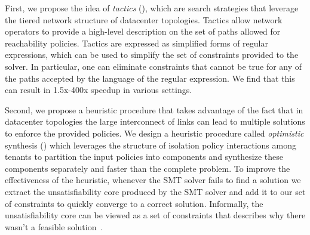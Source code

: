 First, we propose the idea of \emph{tactics} (),
which are search strategies that leverage the tiered network structure
of datacenter topologies.
Tactics allow network operators to provide a high-level description on
the set of paths allowed for reachability policies.  Tactics are
expressed as simplified forms of regular expressions, which can be
used to simplify the set of constraints provided to the solver.  In
particular, one can eliminate constraints that cannot be true for any
of the paths accepted by the language of the regular expression. We
find that this can result in 1.5x-400x speedup in various settings.

Second, we propose a heuristic procedure that takes advantage of the fact that in 
datacenter topologies the large
interconnect of links can lead to multiple solutions 
to enforce the provided policies.  
We design a heuristic procedure called \emph{optimistic}
synthesis () which leverages the structure of
isolation policy interactions among tenants to partition the input
policies into components and synthesize these components separately and
faster than the complete problem. To improve the effectiveness of the
heuristic, whenever the SMT solver fails to find a solution we extract
the unsatisfiability core produced by the SMT solver and 
add it to our set of constraints to quickly converge to a correct solution.
Informally, the unsatisfiability core can be viewed
as a set of constraints that describes why there wasn't a feasible solution~\cite{unsatcores}.

